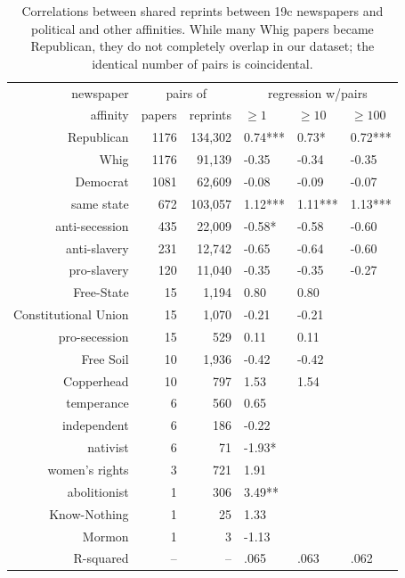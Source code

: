 \documentclass[pdftex,11pt]{article}
\begin{document}
\begin{table}
  \centering
  \begin{tabular}{rrrlll}
    newspaper & \multicolumn{2}{c}{pairs of} & \multicolumn{3}{c}{regression w/pairs} \\
    affinity & papers & reprints & $\ge 1$ & $\ge 10$ & $\ge 100$ \\ \hline
    Republican & 1176 & 134,302 & 0.74*** & 0.73* & 0.72*** \\
    Whig & 1176 & 91,139 & -0.35 & -0.34 & -0.35 \\
    Democrat & 1081 & 62,609 & -0.08 & -0.09 & -0.07 \\
    same state & 672 & 103,057 & 1.12*** & 1.11*** & 1.13*** \\
    anti-secession & 435 & 22,009 & -0.58* & -0.58 & -0.60 \\
    anti-slavery & 231 & 12,742 & -0.65 & -0.64 & -0.60 \\
    pro-slavery & 120 & 11,040 & -0.35 & -0.35 & -0.27 \\
    Free-State & 15 & 1,194 & 0.80 & 0.80 & \\
    Constitutional Union & 15 & 1,070 & -0.21 & -0.21 & \\
    pro-secession & 15 & 529 & 0.11 & 0.11 & \\
    Free Soil & 10 & 1,936 & -0.42 & -0.42 & \\
    Copperhead & 10 & 797 & 1.53 & 1.54 & \\
    temperance & 6 & 560 & 0.65 & & \\
    independent & 6 & 186 & -0.22 & & \\
    nativist & 6 & 71 & -1.93* & & \\
    women's rights & 3 & 721 & 1.91 & & \\
    abolitionist & 1 & 306 & 3.49** & & \\
    Know-Nothing & 1 & 25 & 1.33 & & \\
    Mormon & 1 & 3 & -1.13 & & \\ \hline
    R-squared & -- & -- & .065 & .063 & .062 \\    
  \end{tabular}
  \caption{Correlations between shared reprints between 19c newspapers and political and other affinities.  While many Whig papers became Republican, they do not completely overlap in our dataset; the identical number of pairs is coincidental.}
  \label{tab:newspaper-regression}
\end{table}
\end{document}
